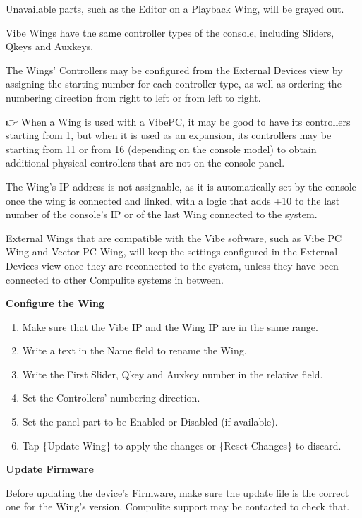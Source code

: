 \documentclass[
]{article}
\begin{document}
Unavailable parts, such as the Editor on a Playback Wing, will be grayed out.

Vibe Wings have the same controller types of the console, including Sliders, Qkeys and Auxkeys.

The Wings' Controllers may be configured from the External Devices view by assigning the starting number for each controller type, as well as ordering the numbering direction from right to left or from left to right.

👉 When a Wing is used with a VibePC, it may be good to have its controllers starting from 1, but when it is used as an expansion, its controllers may be starting from 11 or from 16 (depending on the console model) to obtain additional physical controllers that are not on the console panel.

The Wing's IP address is not assignable, as it is automatically set by the console once the wing is connected and linked, with a logic that adds +10 to the last number of the console's IP or of the last Wing connected to the system.

External Wings that are compatible with the Vibe software, such as Vibe PC Wing and Vector PC Wing, will keep the settings configured in the External Devices view once they are reconnected to the system, unless they have been connected to other Compulite systems in between.

\textbf{Configure the Wing}

\begin{enumerate}
\def\labelenumi{\arabic{enumi}.}
\item
  Make sure that the Vibe IP and the Wing IP are in the same range.
\item
  Write a text in the Name field to rename the Wing.
\item
  Write the First Slider, Qkey and Auxkey number in the relative field.
\item
  Set the Controllers' numbering direction.
\item
  Set the panel part to be Enabled or Disabled (if available).
\item
  Tap \{Update Wing\} to apply the changes or \{Reset Changes\} to discard.
\end{enumerate}

\textbf{Update Firmware}

Before updating the device's Firmware, make sure the update file is the correct one for the Wing's version. Compulite support may be contacted to check that.
\end{document}
